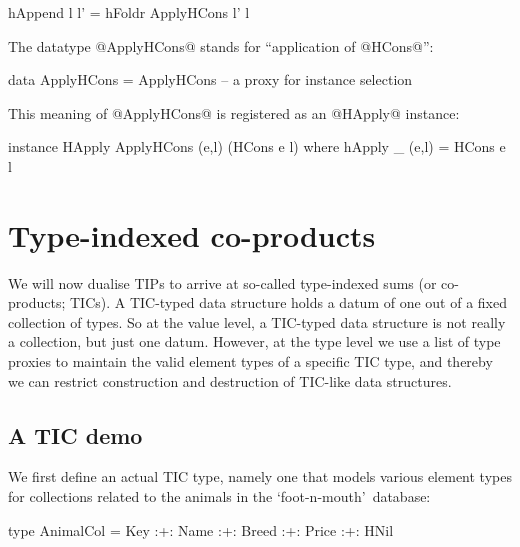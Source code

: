 \documentclass[nocopyrightspace,preprint]{sigplan-proc}
\newcommand{\fm}{`foot-n-mouth'}
\begin{document}
\begin{code}
 hAppend l l' = hFoldr ApplyHCons l' l
\end{code}

The datatype @ApplyHCons@ stands for ``application of @HCons@'':

\begin{code}
 data ApplyHCons =
      ApplyHCons -- a proxy for instance selection
\end{code}

This meaning of @ApplyHCons@ is registered as an @HApply@ instance:

\begin{code}
 instance HApply ApplyHCons (e,l) (HCons e l)
  where
   hApply _ (e,l) = HCons e l
\end{code}






\section{Type-indexed co-products}
\label{A:TIC}

We will now dualise TIPs to arrive at so-called type-indexed sums (or
co-products; TICs). A TIC-typed data structure holds a datum of one
out of a fixed collection of types.  So at the value level, a
TIC-typed data structure is not really a collection, but just one
datum. However, at the type level we use a list of type proxies to
maintain the valid element types of a specific TIC type, and thereby
we can restrict construction and destruction of TIC-like data
structures.

\medskip

\subsection*{A TIC demo}

We first define an actual TIC type, namely one that models various
element types for collections related to the animals in the \fm\
database:

\begin{code}
 type AnimalCol =
   Key :+: Name :+: Breed :+: Price :+: HNil
\end{code}
\end{document}
